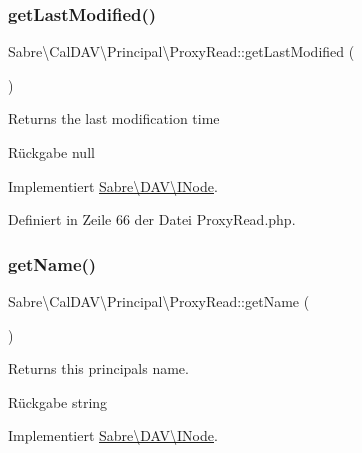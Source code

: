 \subsubsection{\texorpdfstring{get\+Last\+Modified()}{getLastModified()}}
{\footnotesize\ttfamily Sabre\textbackslash{}\+Cal\+D\+A\+V\textbackslash{}\+Principal\textbackslash{}\+Proxy\+Read\+::get\+Last\+Modified (\begin{DoxyParamCaption}{ }\end{DoxyParamCaption})}

Returns the last modification time

\begin{DoxyReturn}{Rückgabe}
null 
\end{DoxyReturn}


Implementiert \mbox{\hyperlink{interface_sabre_1_1_d_a_v_1_1_i_node_a06335f81c7d4ec2c6d9e327c8ce61014}{Sabre\textbackslash{}\+D\+A\+V\textbackslash{}\+I\+Node}}.



Definiert in Zeile 66 der Datei Proxy\+Read.\+php.

\mbox{\label{class_sabre_1_1_cal_d_a_v_1_1_principal_1_1_proxy_read_a872398a5681d2f434498c8e632fee88e}} 
\subsubsection{\texorpdfstring{get\+Name()}{getName()}}
{\footnotesize\ttfamily Sabre\textbackslash{}\+Cal\+D\+A\+V\textbackslash{}\+Principal\textbackslash{}\+Proxy\+Read\+::get\+Name (\begin{DoxyParamCaption}{ }\end{DoxyParamCaption})}

Returns this principals name.

\begin{DoxyReturn}{Rückgabe}
string 
\end{DoxyReturn}


Implementiert \mbox{\hyperlink{interface_sabre_1_1_d_a_v_1_1_i_node_ab616fe836b1ae36af12126a2bc934dce}{Sabre\textbackslash{}\+D\+A\+V\textbackslash{}\+I\+Node}}.



